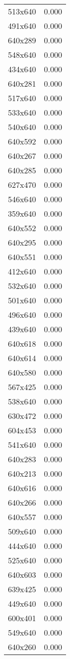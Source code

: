\begin{table}
\begin{tabular}{lr}
513x640 & 0.000 \\
491x640 & 0.000 \\
640x289 & 0.000 \\
548x640 & 0.000 \\
434x640 & 0.000 \\
640x281 & 0.000 \\
517x640 & 0.000 \\
533x640 & 0.000 \\
540x640 & 0.000 \\
640x592 & 0.000 \\
640x267 & 0.000 \\
640x285 & 0.000 \\
627x470 & 0.000 \\
546x640 & 0.000 \\
359x640 & 0.000 \\
640x552 & 0.000 \\
640x295 & 0.000 \\
640x551 & 0.000 \\
412x640 & 0.000 \\
532x640 & 0.000 \\
501x640 & 0.000 \\
496x640 & 0.000 \\
439x640 & 0.000 \\
640x618 & 0.000 \\
640x614 & 0.000 \\
640x580 & 0.000 \\
567x425 & 0.000 \\
538x640 & 0.000 \\
630x472 & 0.000 \\
604x453 & 0.000 \\
541x640 & 0.000 \\
640x283 & 0.000 \\
640x213 & 0.000 \\
640x616 & 0.000 \\
640x266 & 0.000 \\
640x557 & 0.000 \\
509x640 & 0.000 \\
444x640 & 0.000 \\
525x640 & 0.000 \\
640x603 & 0.000 \\
639x425 & 0.000 \\
449x640 & 0.000 \\
600x401 & 0.000 \\
549x640 & 0.000 \\
640x260 & 0.000 \\

\end{tabular}
\end{table}

